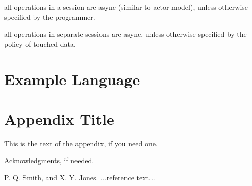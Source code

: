 \documentclass[preprint, numbers]{sigplanconf}
\begin{document}
all operations in a session are async (similar to actor model), unless otherwise
specified by the programmer.

all operations in separate sessions are async, unless otherwise specified by the
policy of touched data.

\section{Example Language}
\appendix
\section{Appendix Title}

This is the text of the appendix, if you need one.

\acks

Acknowledgments, if needed.





\begin{thebibliography}{}
\softraggedright

P. Q. Smith, and X. Y. Jones. ...reference text...

\end{thebibliography}
\end{document}
